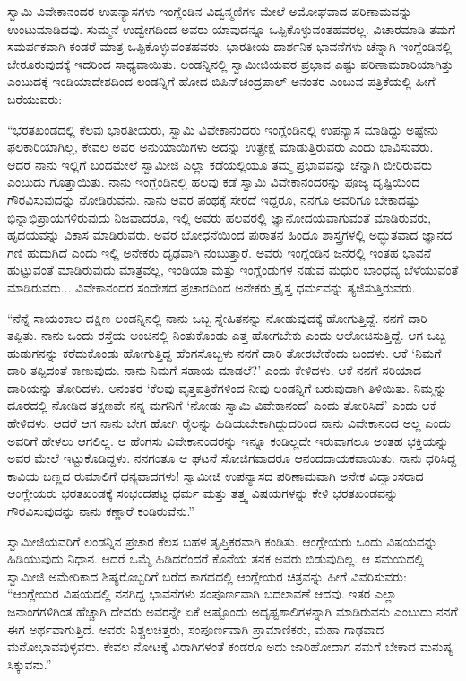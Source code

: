  ಸ್ವಾಮಿ ವಿವೇಕಾನಂದರ ಉಪನ್ಯಾಸಗಳು ಇಂಗ್ಲೆಂಡಿನ ವಿದ್ವನ್ಮಣಿಗಳ ಮೇಲೆ ಅಮೋಘವಾದ ಪರಿಣಾಮವನ್ನು ಉಂಟುಮಾಡಿದವು. ಸುಮ್ಮನೆ ಉದ್ವೇಗದಿಂದ ಅವರು ಯಾವುದನ್ನೂ ಒಪ್ಪಿಕೊಳ್ಳುವಂತಹವರಲ್ಲ. ವಿಚಾರಮಾಡಿ ತಮಗೆ ಸಮರ್ಪಕವಾಗಿ ಕಂಡರೆ ಮಾತ್ರ ಒಪ್ಪಿಕೊಳ್ಳುವಂತಹವರು. ಭಾರತೀಯ ದಾರ್ಶನಿಕ ಭಾವನೆಗಳು ಚೆನ್ನಾಗಿ ಇಂಗ್ಲೆಂಡಿನಲ್ಲಿ ಬೇರೂರುವುದಕ್ಕೆ ಇದರಿಂದ ಸಾಧ್ಯವಾಯಿತು. ಲಂಡನ್ನಿನಲ್ಲಿ ಸ್ವಾಮೀಜಿಯವರ ಪ್ರಭಾವ ಎಷ್ಟು ಪರಿಣಾಮಕಾರಿಯಾಗಿತ್ತು ಎಂಬುದಕ್ಕೆ ಇಂಡಿಯಾದೇಶದಿಂದ ಲಂಡನ್ನಿಗೆ ಹೋದ ಬಿಪಿನ್‌ಚಂದ್ರಪಾಲ್ ಅನಂತರ  ಎಂಬುವ ಪತ್ರಿಕೆಯಲ್ಲಿ ಹೀಗೆ ಬರೆಯುವರು: 

 “ಭರತಖಂಡದಲ್ಲಿ ಕೆಲವು ಭಾರತೀಯರು, ಸ್ವಾಮಿ ವಿವೇಕಾನಂದರು ಇಂಗ್ಲೆಂಡಿನಲ್ಲಿ ಉಪನ್ಯಾಸ ಮಾಡಿದ್ದು ಅಷ್ಟೇನು ಫಲಕಾರಿಯಾಗಿಲ್ಲ, ಕೇವಲ ಅವರ ಅನುಯಾಯಿಗಳು ಅದನ್ನು ಉತ್ಪ್ರೇಕ್ಷೆ ಮಾಡುತ್ತಿರುವರು ಎಂದು ಭಾವಿಸುವರು. ಆದರೆ ನಾನು ಇಲ್ಲಿಗೆ ಬಂದಮೇಲೆ ಸ್ವಾಮೀಜಿ ಎಲ್ಲಾ ಕಡೆಯಲ್ಲಿಯೂ ತಮ್ಮ ಪ್ರಭಾವವನ್ನು ಚೆನ್ನಾಗಿ ಬೀರಿರುವರು ಎಂಬುದು ಗೊತ್ತಾಯಿತು. ನಾನು ಇಂಗ್ಲೆಂಡಿನಲ್ಲಿ ಹಲವು ಕಡೆ ಸ್ವಾಮಿ ವಿವೇಕಾನಂದರನ್ನು ಪೂಜ್ಯ ದೃಷ್ಟಿಯಿಂದ ಗೌರವಿಸುವುದನ್ನು ನೋಡಿರುವೆನು. ನಾನು ಅವರ ಪಂಥಕ್ಕೆ ಸೇರದೆ ಇದ್ದರೂ, ನನಗೂ ಅವರಿಗೂ ಬೇಕಾದಷ್ಟು ಭಿನ್ನಾಭಿಪ್ರಾಯಗಳಿರುವುದು ನಿಜವಾದರೂ, ಇಲ್ಲಿ ಅವರು ಹಲವರಲ್ಲಿ ಜ್ಞಾನೋದಯವಾಗುವಂತೆ ಮಾಡಿರುವರು, ಹೃದಯವನ್ನು ವಿಕಾಸ ಮಾಡಿರುವರು. ಅವರ ಬೋಧನೆಯಿಂದ ಪುರಾತನ ಹಿಂದೂ ಶಾಸ್ತ್ರಗಳಲ್ಲಿ ಅದ್ಭುತವಾದ ಜ್ಞಾನದ ಗಣಿ ಹುದುಗಿದೆ ಎಂದು ಇಲ್ಲಿ ಅನೇಕರು ದೃಢವಾಗಿ ನಂಬುತ್ತಾರೆ. ಅವರು ಇಂಗ್ಲೆಂಡಿನ ಜನರಲ್ಲಿ ಇಂತಹ ಭಾವನೆ ಹುಟ್ಟುವಂತೆ ಮಾಡಿರುವುದು ಮಾತ್ರವಲ್ಲ, ಇಂಡಿಯಾ ಮತ್ತು ಇಂಗ್ಲೆಂಡುಗಳ ನಡುವೆ ಮಧುರ ಬಾಂಧವ್ಯ ಬೆಳೆಯುವಂತೆ ಮಾಡಿರುವರು... ವಿವೇಕಾನಂದರ ಸಂದೇಶದ ಪ್ರಚಾರದಿಂದ ಅನೇಕರು ಕ್ರೈಸ್ತ ಧರ್ಮವನ್ನು ತ್ಯಜಿಸುತ್ತಿರುವರು. 

 “ನೆನ್ನೆ ಸಾಯಂಕಾಲ ದಕ್ಷಿಣ ಲಂಡನ್ನಿನಲ್ಲಿ ನಾನು ಒಬ್ಬ ಸ್ನೇಹಿತನನ್ನು ನೋಡುವುದಕ್ಕೆ ಹೋಗುತ್ತಿದ್ದೆ. ನನಗೆ ದಾರಿ ತಪ್ಪಿತು. ನಾನು ಒಂದು ರಸ್ತೆಯ ಅಂಚಿನಲ್ಲಿ ನಿಂತುಕೊಂಡು ಎತ್ತ ಹೋಗಬೇಕು ಎಂದು ಆಲೋಚಿಸುತ್ತಿದ್ದೆ. ಆಗ ಒಬ್ಬ ಹುಡುಗನನ್ನು ಕರೆದುಕೊಂಡು ಹೋಗುತ್ತಿದ್ದ ಹೆಂಗಸೊಬ್ಬಳು ನನಗೆ ದಾರಿ ತೋರಬೇಕೆಂದು ಬಂದಳು. ಆಕೆ ‘ನಿಮಗೆ ದಾರಿ ತಪ್ಪಿದಂತೆ ಕಾಣುವುದು. ನಾನು ನಿಮಗೆ ಸಹಾಯ ಮಾಡಲೆ?’ ಎಂದು ಕೇಳಿದಳು. ಆಕೆ ನನಗೆ ಸರಿಯಾದ ದಾರಿಯನ್ನು ತೋರಿದಳು. ಅನಂತರ ‘ಕೆಲವು ವೃತ್ತಪತ್ರಿಕೆಗಳಿಂದ ನೀವು ಲಂಡನ್ನಿಗೆ ಬರುವುದಾಗಿ ತಿಳಿಯಿತು. ನಿಮ್ಮನ್ನು ದೂರದಲ್ಲಿ ನೋಡಿದ ತಕ್ಷಣವೇ ನನ್ನ ಮಗನಿಗೆ ‘ನೋಡು ಸ್ವಾಮಿ ವಿವೇಕಾನಂದ’ ಎಂದು ತೋರಿಸಿದೆ’ ಎಂದು ಆಕೆ ಹೇಳಿದಳು. ಆದರೆ ಆಗ ನಾನು ಬೇಗ ಹೋಗಿ ರೈಲನ್ನು ಹಿಡಿಯಬೇಕಾಗಿದ್ದುದರಿಂದ ನಾನು ವಿವೇಕಾನಂದ ಅಲ್ಲ ಎಂದು ಅವರಿಗೆ ಹೇಳಲು ಆಗಲಿಲ್ಲ. ಆ ಹೆಂಗಸು ವಿವೇಕಾನಂದರನ್ನು ಇನ್ನೂ ಕಂಡಿಲ್ಲದೇ ಇರುವಾಗಲೂ ಅಂತಹ ಭಕ್ತಿಯನ್ನು ಅವರ ಮೇಲೆ ಇಟ್ಟುಕೊಡಿದ್ದಳು. ನನಗಂತೂ ಆ ಘಟನೆ ಸೋಜಿಗವಾದರೂ ಆನಂದದಾಯಕವಾಯಿತು. ನಾನು ಧರಿಸಿದ್ದ ಕಾವಿಯ ಬಣ್ಣದ ರುಮಾಲಿಗೆ ಧನ್ಯವಾದಗಳು! ಸ್ವಾಮೀಜಿ ಉಪನ್ಯಾಸದ ಪರಿಣಾಮವಾಗಿ ಅನೇಕ ವಿದ್ವಾಂಸರಾದ ಆಂಗ್ಲೇಯರು ಭರತಖಂಡಕ್ಕೆ ಸಂಭಂದಪಟ್ಟ ಧರ್ಮ ಮತ್ತು ತತ್ತ್ವ ವಿಷಯಗಳನ್ನು ಕೇಳಿ ಭರತಖಂಡವನ್ನು ಗೌರವಿಸುವುದನ್ನು ನಾನು ಕಣ್ಣಾರೆ ಕಂಡಿರುವೆನು.” 

 ಸ್ವಾಮೀಜಿಯವರಿಗೆ ಲಂಡನ್ನಿನ ಪ್ರಚಾರ ಕೆಲಸ ಬಹಳ ತೃಪ್ತಿಕರವಾಗಿ ಕಂಡಿತು. ಆಂಗ್ಲೇಯರು ಒಂದು ವಿಷಯವನ್ನು ಹಿಡಿಯುವುದು ನಿಧಾನ. ಆದರೆ ಒಮ್ಮೆ ಹಿಡಿದರೆಂದರೆ ಕೊನೆಯ ತನಕ ಅವರು ಬಿಡುವುದಿಲ್ಲ. ಆ ಸಮಯದಲ್ಲಿ ಸ್ವಾಮೀಜಿ ಅಮೇರಿಕಾದ ಶಿಷ್ಯರೊಬ್ಬರಿಗೆ ಬರೆದ ಕಾಗದದಲ್ಲಿ ಆಂಗ್ಲೇಯರ ಚಿತ್ರವನ್ನು ಹೀಗೆ ವಿವರಿಸುವರು: “ಆಂಗ್ಲೇಯರ ವಿಷಯದಲ್ಲಿ ನನಗಿದ್ದ ಭಾವನೆಗಳು ಸಂಪೂರ್ಣವಾಗಿ ಬದಲಾವಣೆ ಆದವು. ಇತರ ಎಲ್ಲಾ ಜನಾಂಗಗಳಿಗಿಂತ ಹೆಚ್ಚಾಗಿ ದೇವರು ಅವರನ್ನೇ ಏಕೆ ಅಷ್ಟೊಂದು ಅದೃಷ್ಟಶಾಲಿಗಳನ್ನಾಗಿ ಮಾಡಿರುವನು ಎಂಬುದು ನನಗೆ ಈಗ ಅರ್ಥವಾಗುತ್ತಿದೆ. ಅವರು ನಿಶ್ಚಲಚಿತ್ತರು, ಸಂಪೂರ್ಣವಾಗಿ ಪ್ರಾಮಾಣಿಕರು, ಮಹಾ ಗಾಢವಾದ ಮನೋಭಾವವುಳ್ಳವರು. ಕೇವಲ ನೋಟಕ್ಕೆ ವಿರಾಗಿಗಳಂತೆ ಕಂಡರೂ ಅದು ಜಾರಿಹೋದಾಗ ನಮಗೆ ಬೇಕಾದ ಮನುಷ್ಯ ಸಿಕ್ಕುವನು.” 

